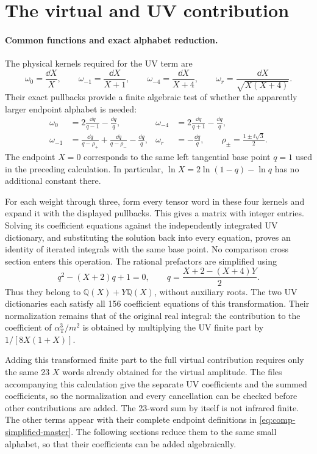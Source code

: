 

\section{The virtual and UV contribution}
\paragraph{Common functions and exact alphabet reduction.}
The physical kernels required for the UV term are
\begin{equation}
 \omega_0=\frac{\dd X}{X},\qquad
 \omega_{-1}=\frac{\dd X}{X+1},\qquad
 \omega_{-4}=\frac{\dd X}{X+4},\qquad
 \omega_r=\frac{\dd X}{\sqrt{X(X+4)}}.
\end{equation}
Their exact pullbacks provide a finite algebraic test of whether the
apparently larger endpoint alphabet is needed:
\begin{align}
 \omega_0&=2\frac{\dd q}{q-1}-\frac{\dd q}{q},&
 \omega_{-4}&=2\frac{\dd q}{q+1}-\frac{\dd q}{q},\\
 \omega_{-1}&=\frac{\dd q}{q-\rho_+}+\frac{\dd q}{q-\rho_-}
                    -\frac{\dd q}{q},&
 \omega_r&=-\frac{\dd q}{q},\qquad
 \rho_\pm=\frac{1\pm \ii\sqrt3}{2}.
\end{align}
The endpoint $X=0$ corresponds to the same left tangential base point
$q=1$ used in the preceding calculation.  In particular,
$\ln X=2\ln(1-q)-\ln q$ has no additional constant there.

For each weight through three, form every tensor word in these four
kernels and expand it with the displayed pullbacks.  This gives a matrix
with integer entries.  Solving its coefficient equations against the
independently integrated UV dictionary, and substituting the solution
back into every equation, proves an identity of iterated integrals with
the same base point.  No comparison cross section enters this operation.
The rational prefactors are simplified using
\begin{equation}
 q^2-(X+2)q+1=0,\qquad
 q=\frac{X+2-(X+4)Y}{2}.
\end{equation}
Thus they belong to $\mathbb Q(X)+Y\mathbb Q(X)$, without auxiliary roots.
The two UV dictionaries each satisfy all 156 coefficient equations of
this transformation.  Their normalization remains that of the original
real integral: the contribution to the coefficient of $\alpha_{\mathrm T}^3/m^2$
is obtained by multiplying the UV finite part by $1/[8X(1+X)]$.

Adding this transformed finite part to the full virtual contribution
requires only the same 23 $X$ words already obtained for the virtual
amplitude.  The files accompanying this calculation give the separate
UV coefficients and the summed coefficients, so the normalization and
every cancellation can be checked before other contributions are added.
The 23-word sum by itself is not infrared finite.  The other terms appear with their complete endpoint definitions in
\eqref{eq:comp-simplified-master}.  The following sections reduce them to the same small alphabet,
so that their coefficients can be added algebraically.

